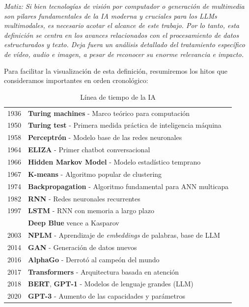\begin{enumerate}
	\emph{Matiz: Si bien tecnologías de visión por computador o generación de multimedia son pilares fundamentales de la IA moderna y cruciales para los LLMs multimodales, es necesario acotar el alcance de este trabajo. Por lo tanto, esta definición se centra en los avances relacionados con el procesamiento de datos estructurados y texto. Deja fuera un análisis detallado del tratamiento específico de vídeo, audio e imagen, a pesar de reconocer su enorme relevancia e impacto.}

	Para facilitar la visualización de esta definición, resumiremos los hitos que consideramos importantes en orden cronológico:
	\begin{table}[htbp]
		\centering
		\caption{Línea de tiempo de la IA}
		\begin{tabular}{@{}r@{\hspace{1em}}|@{\hspace{1em}}p{11cm}@{}}
			1936 & \textbf{Turing machines} - Marco teórico para computación \\
			1950 & \textbf{Turing test} - Primera medida práctica de inteligencia máquina \\
			1958 & \textbf{Perceptrón} - Modelo base de las redes neuronales \\
			1964 & \textbf{ELIZA} - Primer chatbot conversacional \\
			1966 & \textbf{Hidden Markov Model} - Modelo estadístico temprano \\
			1967 & \textbf{K-means} - Algoritmo popular de clustering \\
			1974 & \textbf{Backpropagation} - Algoritmo fundamental para ANN multicapa \\
			1982 & \textbf{RNN} - Redes neuronales recurrentes\\
			1997 & \textbf{LSTM} - RNN con memoria a largo plazo \\
			& \textbf{Deep Blue} vence a Kasparov \\
			2003 & \textbf{NPLM} - Aprendizaje de \textit{embeddings} de palabras, base de LLM \\
			2014 & \textbf{GAN} - Generación de datos nuevos \\
			2016 & \textbf{AlphaGo} - Derrotó al campeón del mundo \\
			2017 & \textbf{Transformers} - Arquitectura basada en atención \\
			2018 & \textbf{BERT}, \textbf{GPT-1} - Modelos de lenguaje grandes (LLM) \\
			2020 & \textbf{GPT-3} - Aumento de las capacidades y parámetros \\

\end{tabular}
\end{table}
\end{enumerate}
